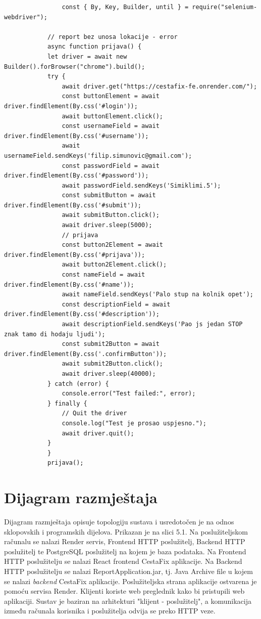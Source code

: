 			\begin{verbatim}
				const { By, Key, Builder, until } = require("selenium-webdriver");

			// report bez unosa lokacije - error
			async function prijava() {
			let driver = await new Builder().forBrowser("chrome").build();
			try {
				await driver.get("https://cestafix-fe.onrender.com/");
				const buttonElement = await driver.findElement(By.css('#login'));
				await buttonElement.click();
				const usernameField = await driver.findElement(By.css('#username'));
				await usernameField.sendKeys('filip.simunovic@gmail.com');
				const passwordField = await driver.findElement(By.css('#password'));
				await passwordField.sendKeys('Simiklimi.5');
				const submitButton = await driver.findElement(By.css('#submit'));
				await submitButton.click();
				await driver.sleep(5000);
				// prijava
				const button2Element = await driver.findElement(By.css('#prijava'));
				await button2Element.click();
				const nameField = await driver.findElement(By.css('#name'));
				await nameField.sendKeys('Palo stup na kolnik opet');
				const descriptionField = await driver.findElement(By.css('#description'));
				await descriptionField.sendKeys('Pao js jedan STOP znak tamo di hodaju ljudi');
				const submit2Button = await driver.findElement(By.css('.confirmButton'));
				await submit2Button.click();
				await driver.sleep(40000);
			} catch (error) {
				console.error("Test failed:", error);
			} finally {
				// Quit the driver
				console.log("Test je prosao uspjesno.");
				await driver.quit();
			}
			}
			prijava();
			\end{verbatim}

			
			\eject 
		
		\section{Dijagram razmještaja}

			Dijagram razmještaja opisuje topologiju sustava i usredotočen je na odnos sklopovskih i programskih
			dijelova. Prikazan je na slici 5.1. Na poslužiteljskom računalu se nalazi Render servis, Frontend HTTP poslužitelj, Backend HTTP 
			poslužitelj te PostgreSQL poslužitelj na kojem je baza podataka. Na Frontend HTTP poslužitelju se nalazi
			React frontend CestaFix aplikacije. Na Backend HTTP poslužitelju se nalazi ReportApplication.jar, tj. 
			Java Archive file u kojem se nalazi \textit{backend} CestaFix aplikacije. Poslužiteljska strana aplikacije
			ostvarena je pomoću servisa Render. Klijenti koriste web preglednik kako bi pristupili web aplikaciji. 
			Sustav je baziran na arhitekturi "klijent - poslužitelj", a komunikacija između računala korisnika
			i poslužitelja odvija se preko HTTP veze.

